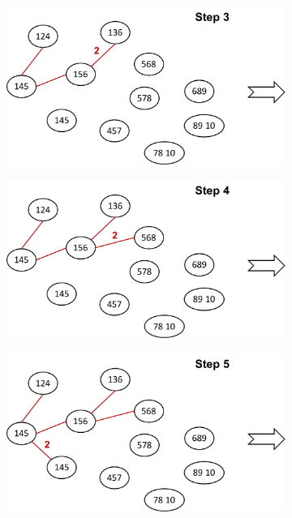 \documentclass{article}
\begin{document}
\begin{figure}[h]
\begin{subfigure}[b]{0.315\textwidth}
  \end{subfigure}
  \hspace{0.1cm}
    \begin{subfigure}[b]{0.315\textwidth}
  	\centering
  	\includegraphics[width=\columnwidth]{3a5.pdf}
  \end{subfigure}
  \hspace{0.1cm}
  \begin{subfigure}[b]{0.315\textwidth}
    \centering
  	\includegraphics[width=\columnwidth]{3a6.pdf}
  \end{subfigure}
  \hspace{0.1cm}
  \begin{subfigure}[b]{0.315\textwidth}
    \centering
  	\includegraphics[width=\columnwidth]{3a7.pdf}

\end{subfigure}
\end{figure}
\end{document}
